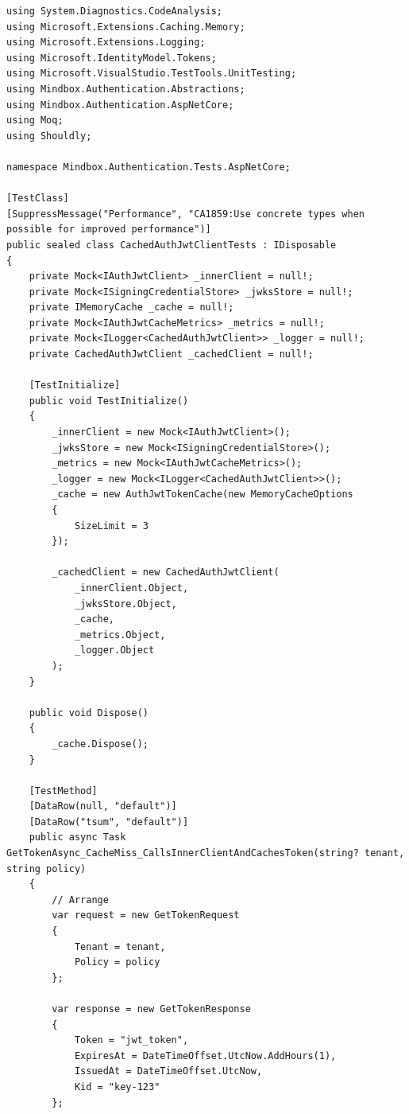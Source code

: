 \begin{lstlisting}[language={[Sharp]C},
  label={lst:app-cached-client-tests},
  caption={Класс CachedAuthJwtClientTests: набор юнит-тестов для кеширующего клиента}]
using System.Diagnostics.CodeAnalysis;
using Microsoft.Extensions.Caching.Memory;
using Microsoft.Extensions.Logging;
using Microsoft.IdentityModel.Tokens;
using Microsoft.VisualStudio.TestTools.UnitTesting;
using Mindbox.Authentication.Abstractions;
using Mindbox.Authentication.AspNetCore;
using Moq;
using Shouldly;

namespace Mindbox.Authentication.Tests.AspNetCore;

[TestClass]
[SuppressMessage("Performance", "CA1859:Use concrete types when possible for improved performance")]
public sealed class CachedAuthJwtClientTests : IDisposable
{
    private Mock<IAuthJwtClient> _innerClient = null!;
    private Mock<ISigningCredentialStore> _jwksStore = null!;
    private IMemoryCache _cache = null!;
    private Mock<IAuthJwtCacheMetrics> _metrics = null!;
    private Mock<ILogger<CachedAuthJwtClient>> _logger = null!;
    private CachedAuthJwtClient _cachedClient = null!;

    [TestInitialize]
    public void TestInitialize()
    {
        _innerClient = new Mock<IAuthJwtClient>();
        _jwksStore = new Mock<ISigningCredentialStore>();
        _metrics = new Mock<IAuthJwtCacheMetrics>();
        _logger = new Mock<ILogger<CachedAuthJwtClient>>();
        _cache = new AuthJwtTokenCache(new MemoryCacheOptions
        {
            SizeLimit = 3
        });

        _cachedClient = new CachedAuthJwtClient(
            _innerClient.Object,
            _jwksStore.Object,
            _cache,
            _metrics.Object,
            _logger.Object
        );
    }

    public void Dispose()
    {
        _cache.Dispose();
    }

    [TestMethod]
    [DataRow(null, "default")]
    [DataRow("tsum", "default")]
    public async Task GetTokenAsync_CacheMiss_CallsInnerClientAndCachesToken(string? tenant, string policy)
    {
        // Arrange
        var request = new GetTokenRequest
        {
            Tenant = tenant,
            Policy = policy
        };

        var response = new GetTokenResponse
        {
            Token = "jwt_token",
            ExpiresAt = DateTimeOffset.UtcNow.AddHours(1),
            IssuedAt = DateTimeOffset.UtcNow,
            Kid = "key-123"
        };


\end{lstlisting}
